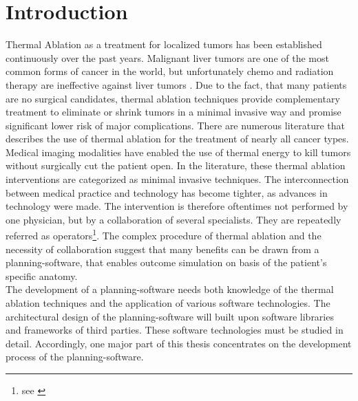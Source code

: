 \chapter*{Introduction}

Thermal Ablation as a treatment for localized tumors has been established continuously over the past years. Malignant liver tumors are one of the most common forms of cancer in the world, but unfortunately chemo and radiation therapy are ineffective against liver tumors \cite{dodd-2000}. Due to the fact, that many patients are no surgical candidates, thermal ablation techniques provide complementary treatment to eliminate or shrink tumors in a minimal invasive way and promise significant lower risk of major complications. There are numerous literature that describes the use of thermal ablation for the treatment of nearly all cancer types. 
\\
Medical imaging modalities have enabled the use of thermal energy to kill tumors without surgically cut the patient open. In the literature, these thermal ablation interventions are categorized as minimal invasive techniques. 
The interconnection between medical practice and technology has become tighter, as advances in technology were made. The intervention is therefore oftentimes not performed by one physician, but by a collaboration of several specialists. They are repeatedly referred as operators\footnote{see \cite{poon-rf}}. The complex procedure of thermal ablation and the necessity of collaboration suggest that  many benefits can be drawn from a planning-software, that enables outcome simulation on basis of the patient's specific anatomy.
\\ 
The development of a planning-software needs both knowledge of the thermal ablation techniques and the application of various software technologies. 
The architectural design of the planning-software will built upon software libraries and frameworks of third parties. These software technologies must be studied in detail. Accordingly, one major part of this thesis concentrates on the development process of the planning-software. 

